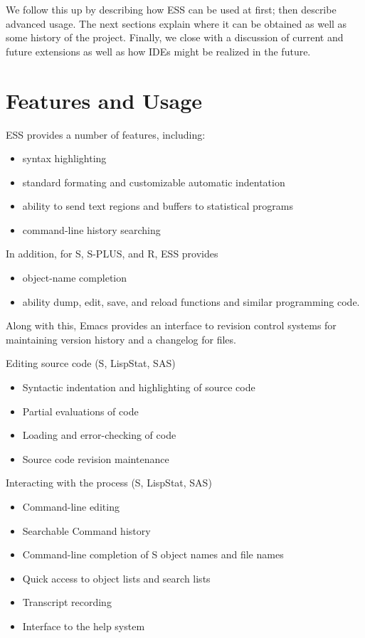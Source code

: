 \documentclass{article}
\begin{document}
We follow this up by describing how ESS can be used at first; then
describe advanced usage.  The next sections explain where it can be
obtained as well as some history of the project.  Finally, we close
with a discussion of current and future extensions as well as how IDEs
might be realized in the future.

\section{Features and Usage}
\label{sec:basic}


ESS provides a number of features, including:
\begin{itemize}
\item syntax highlighting 
\item standard formating and customizable automatic indentation
\item ability to send text regions and buffers to statistical programs
\item command-line history searching 
\end{itemize}

In addition, for S, S-PLUS, and R, ESS provides
\begin{itemize}
\item object-name completion
\item ability dump, edit, save, and reload functions and similar
  programming code.
\end{itemize}

Along with this, Emacs provides an interface to revision control
systems for maintaining version history and a changelog for files.

Editing source code (S, LispStat, SAS)
\begin{itemize}
\item Syntactic indentation and highlighting of source code
\item Partial evaluations of code
\item Loading and error-checking of code
\item Source code revision maintenance
\end{itemize}

Interacting with the process (S, LispStat, SAS)
\begin{itemize}
\item Command-line editing
\item Searchable Command history
\item Command-line completion of S object names and file names
\item Quick access to object lists and search lists
\item Transcript recording
\item Interface to the help system
\end{itemize}
\end{document}
